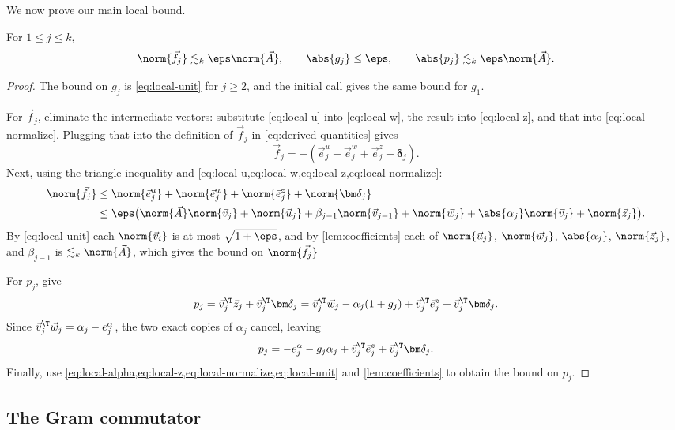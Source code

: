We now prove our main local bound.

\begin{theorem}
\label{thm:local-errors}
For \(1\le j\le k\),
\[
 \norm{\vec f_j}\lesssim_k\eps\norm{\vec A},
 \qquad
 \abs{g_j}\le\eps,
 \qquad
 \abs{p_j}\lesssim_k\eps\norm{\vec A}.
\]
\end{theorem}


\begin{proof}
The bound on \(g_j\) is \cref{eq:local-unit} for \(j\ge2\), and the initial call gives the same bound for \(g_1\).

For \(\vec f_j\), eliminate the intermediate vectors: substitute \cref{eq:local-u} into \cref{eq:local-w}, the result into \cref{eq:local-z}, and that into \cref{eq:local-normalize}.
Plugging that into the definition of \(\vec f_j\) in \cref{eq:derived-quantities} gives
\[
 \vec f_j=-(\vec e^u_j+\vec e^w_j+\vec e^z_j+\bm\delta_j).
\]
Next, using the triangle inequality and \cref{eq:local-u,eq:local-w,eq:local-z,eq:local-normalize}:
\begin{align*}
   \norm{\vec f_j}
 &\le\norm{\vec e^u_j}+\norm{\vec e^w_j}
   +\norm{\vec e^z_j}+\norm{\bm\delta_j}
 \\&\le\eps\bigl(\norm{\vec A}\norm{\vec v_j}
   +\norm{\vec u_j}+\beta_{j-1}\norm{\vec v_{j-1}}
   +\norm{\vec w_j}+\abs{\alpha_j}\norm{\vec v_j}
   +\norm{\vec z_j}\bigr).
\end{align*}
By \cref{eq:local-unit} each \(\norm{\vec v_i}\) is at most \(\sqrt{1+\eps}\), and by \cref{lem:coefficients} each of \(\norm{\vec u_j}\), \(\norm{\vec w_j}\), \(\abs{\alpha_j}\), \(\norm{\vec z_j}\), and \(\beta_{j-1}\) is \(\lesssim_k\norm{\vec A}\), which gives the bound on $\norm{\vec f_j}$


For \(p_j\),  give
\[
 p_j
 =\vec v_j^\T\vec z_j+\vec v_j^\T\bm\delta_j
 =\vec v_j^\T\vec w_j-\alpha_j(1+g_j)
   +\vec v_j^\T\vec e^z_j+\vec v_j^\T\bm\delta_j.
\]
Since \(\vec v_j^\T\vec w_j=\alpha_j-e^\alpha_j\), the two exact copies of \(\alpha_j\) cancel, leaving
\[
 p_j=-e^\alpha_j-g_j\alpha_j
      +\vec v_j^\T\vec e^z_j+\vec v_j^\T\bm\delta_j.
\]
Finally, use \cref{eq:local-alpha,eq:local-z,eq:local-normalize,eq:local-unit} and \cref{lem:coefficients} to obtain the bound on \(p_j\).
\end{proof}

\subsection{The Gram commutator}

